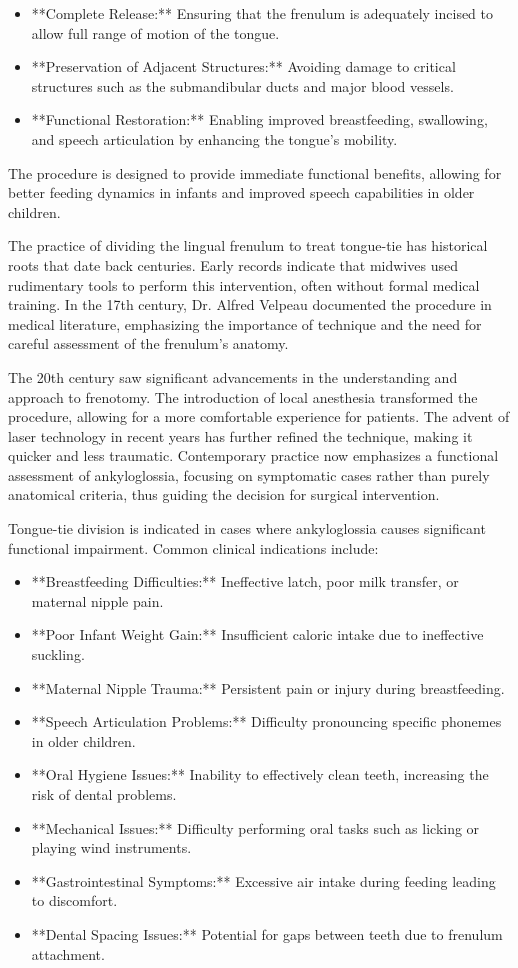 \begin{itemize}
  \item **Complete Release:** Ensuring that the frenulum is adequately incised to allow full range of motion of the tongue.
  \item **Preservation of Adjacent Structures:** Avoiding damage to critical structures such as the submandibular ducts and major blood vessels.
  \item **Functional Restoration:** Enabling improved breastfeeding, swallowing, and speech articulation by enhancing the tongue's mobility.
\end{itemize}

The procedure is designed to provide immediate functional benefits, allowing for better feeding dynamics in infants and improved speech capabilities in older children.

The practice of dividing the lingual frenulum to treat tongue-tie has historical roots that date back centuries. Early records indicate that midwives used rudimentary tools to perform this intervention, often without formal medical training. In the 17th century, Dr. Alfred Velpeau documented the procedure in medical literature, emphasizing the importance of technique and the need for careful assessment of the frenulum's anatomy.

The 20th century saw significant advancements in the understanding and approach to frenotomy. The introduction of local anesthesia transformed the procedure, allowing for a more comfortable experience for patients. The advent of laser technology in recent years has further refined the technique, making it quicker and less traumatic. Contemporary practice now emphasizes a functional assessment of ankyloglossia, focusing on symptomatic cases rather than purely anatomical criteria, thus guiding the decision for surgical intervention.

Tongue-tie division is indicated in cases where ankyloglossia causes significant functional impairment. Common clinical indications include:

\begin{itemize}
  \item **Breastfeeding Difficulties:** Ineffective latch, poor milk transfer, or maternal nipple pain.
  \item **Poor Infant Weight Gain:** Insufficient caloric intake due to ineffective suckling.
  \item **Maternal Nipple Trauma:** Persistent pain or injury during breastfeeding.
  \item **Speech Articulation Problems:** Difficulty pronouncing specific phonemes in older children.
  \item **Oral Hygiene Issues:** Inability to effectively clean teeth, increasing the risk of dental problems.
  \item **Mechanical Issues:** Difficulty performing oral tasks such as licking or playing wind instruments.
  \item **Gastrointestinal Symptoms:** Excessive air intake during feeding leading to discomfort.
  \item **Dental Spacing Issues:** Potential for gaps between teeth due to frenulum attachment.
\end{itemize}

